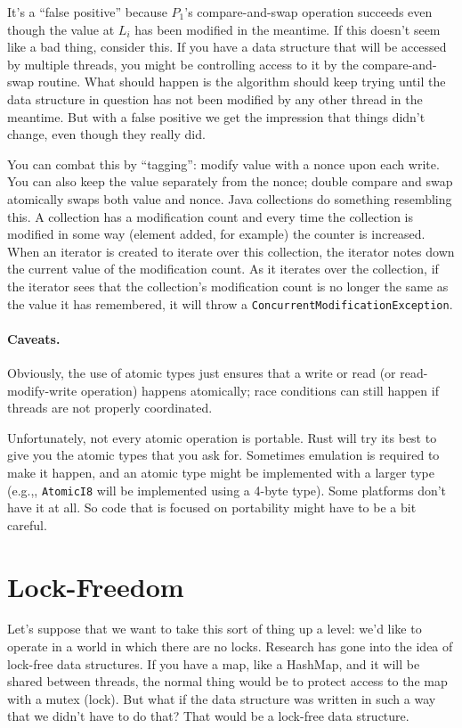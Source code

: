 It's a ``false positive'' because $P_{1}$'s compare-and-swap operation succeeds even though the value at $L_{i}$ has been modified in the meantime. If this doesn't seem like a bad thing, consider this. If you have a data structure that will be accessed by multiple threads, you might be controlling access to it by the compare-and-swap routine. What should happen is the algorithm should keep trying until the data structure in question has not been modified by any other thread in the meantime. But with a false positive we get the impression that things didn't change, even though they really did.

You can combat this by ``tagging'': modify value with a nonce upon each
write.  You can also keep the value separately from the nonce; double
compare and swap atomically swaps both value and nonce. Java collections do something resembling this. A collection has a modification count and every time the collection is modified in some way (element added, for example) the counter is increased. When an iterator is created to iterate over this collection, the iterator notes down the current value of the modification count. As it iterates over the collection, if the iterator sees that the collection's modification count is no longer the same as the value it has remembered, it will throw a \texttt{ConcurrentModificationException}. 


\paragraph{Caveats.}
Obviously, the use of atomic types just ensures that a write or read (or read-modify-write operation) happens atomically; race conditions can still happen if threads are not properly coordinated.


Unfortunately, not every atomic operation is portable. Rust will try its best to give you the atomic types that you ask for. Sometimes emulation is required to make it happen, and an atomic type might be implemented with a larger type (e.g.,, \texttt{AtomicI8} will be implemented using a 4-byte type). Some platforms don't have it at all. So code that is focused on portability might have to be a bit careful.

\section*{Lock-Freedom}

Let's suppose that we want to take this sort of thing up a level: we'd like to operate in a world in which there are no locks. Research has gone into the idea of lock-free data structures. If you have a map, like a HashMap, and it will be shared between threads, the normal thing would be to protect access to the map with a mutex (lock). But what if the data structure was written in such a way that we didn't have to do that? That would be a lock-free data structure.

